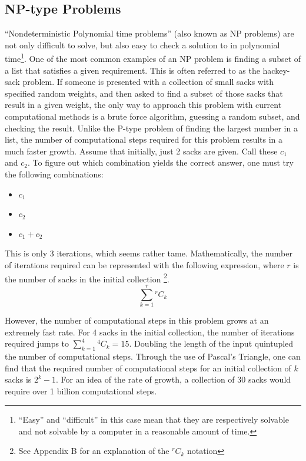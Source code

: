 \documentclass[10pt,journal,compsoc]{IEEEtran}
\newcommand*{\Comb}[2]{{}^{#1}C_{#2}}%
\begin{document}
\subsection{NP-type Problems}
 ``Nondeterministic Polynomial time problems'' (also known as NP problems) are not only difficult to solve, but also easy to check a solution to in polynomial time\footnote{``Easy'' and ``difficult'' in this case mean that they are respectively solvable and not solvable by a computer in a reasonable amount of time.}. One of the most common examples of an NP problem is finding a subset of a list that satisfies a given requirement. This is often referred to as the hackey-sack problem. If someone is presented with a collection of small sacks with specified random weights, and then asked to find a subset of those sacks that result in a given weight, the only way to approach this problem with current computational methods is a brute force algorithm, guessing a random subset, and checking the result. Unlike the P-type problem of finding the largest number in a list, the number of computational steps required for this problem results in a much faster growth. Assume that initially, just 2 sacks are given. Call these $c_1$ and $c_2$. To figure out which combination yields the correct answer, one must try the following combinations:
\begin{itemize}
	\item $c_1$
	\item $c_2$
	\item $c_1+c_2$
\end{itemize}
This is only 3 iterations, which seems rather tame. Mathematically, the number of iterations required can be represented with the following expression, where $r$ is the number of sacks in the initial collection \footnote{See Appendix B for an explanation of the $\Comb{r}{k}$ notation}. $$\sum_{k=1}^{r} \Comb{r}{k}$$ 

However, the number of computational steps in this problem grows at an extremely fast rate. For 4 sacks in the initial collection, the number of iterations required jumps to $\sum_{k=1}^{4} \Comb{4}{k} = 15$. Doubling the length of the input quintupled the number of computational steps. Through the use of Pascal's Triangle, one can find that the required number of computational steps for an initial collection of $k$ sacks is $2^k-1$. For an idea of the rate of growth, a collection of 30 sacks would require over 1 billion computational steps. \\
\end{document}
